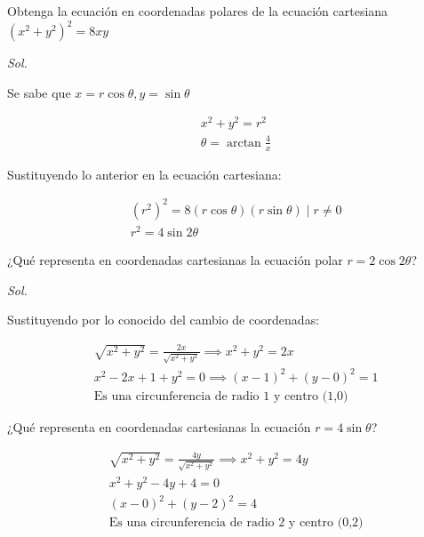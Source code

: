 \begin{example}
	Obtenga la ecuación en coordenadas polares de la ecuación cartesiana $\left(x^2+y^2\right)^2=8xy$
\end{example}

\textit{ Sol. }

Se sabe que $x=r\cos\theta,y=\sin{\theta}$

\begin{align*}
	 & x^2+y^2=r^2                 \\
	 & \theta=\arctan{\frac{4}{x}}
\end{align*}

Sustituyendo lo anterior en la ecuación cartesiana:

\begin{align*}
	 & \left(r^2\right)^2=8\left(r\cos{\theta}\right)\left(r\sin{\theta}\right)\mid r\neq 0 \\
	 & r^2=4\sin{2\theta}
\end{align*}


\begin{example}
	¿Qué representa en coordenadas cartesianas la ecuación polar $r=2\cos{2\theta}$?

\end{example}

\textit{ Sol. }

Sustituyendo por lo conocido del cambio de coordenadas:

\begin{align*}
	 & \sqrt{x^2+y^2}=\frac{2x}{\sqrt{x^2+y^2}}\implies x^2+y^2=2x \\
	 & x^2-2x+1+y^2=0\implies (x-1)^2+(y-0)^2=1                    \\
	 & \text{Es una circunferencia de radio 1 y centro (1,0)}
\end{align*}

\begin{example}
	¿Qué representa en coordenadas cartesianas la ecuación $r=4\sin{\theta}$?
\end{example}

\begin{align*}
	 & \sqrt{x^2+y^2}=\frac{4y}{\sqrt{x^2+y^2}}\implies x^2+y^2=4y \\
	 & x^2+y^2-4y+4=0                                              \\
	 & (x-0)^2+(y-2)^2=4                                           \\
	 & \text{Es una circunferencia de radio 2 y centro (0,2)}
\end{align*}

